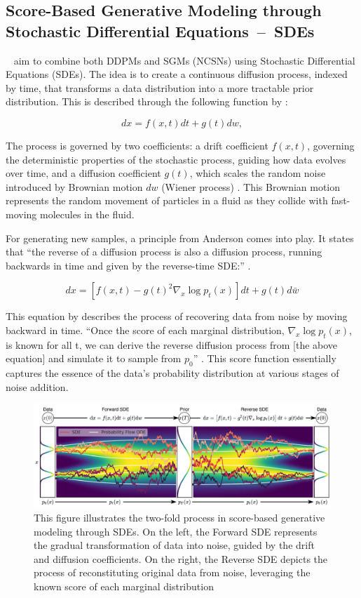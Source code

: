 \subsection{Score-Based Generative Modeling through Stochastic Differential Equations~--~SDEs}

~\citeauthor{song2020score} aim to combine both DDPMs and SGMs (NCSNs) using Stochastic Differential Equations (SDEs). The idea is to create a continuous diffusion process, indexed by time, that transforms a data distribution into a more tractable prior distribution. This is described through the following function by \citeauthor{song2020score}:

\[ dx = f(x, t)dt + g(t)dw, \]

The process is governed by two coefficients: a drift coefficient \( f(x, t) \), governing the deterministic properties of the stochastic process, guiding how data evolves over time, and a diffusion coefficient \( g(t) \), which scales the random noise introduced by Brownian motion \( dw \) (Wiener process) \citep{song2020score}. This Brownian motion represents the random movement of particles in a fluid as they collide with fast-moving molecules in the fluid. 


For generating new samples, a  principle from Anderson \citep{anderson1982313} comes into play. It states that ``the reverse of a diffusion process is also a diffusion process, running backwards in time and given by the reverse-time SDE:\@'' \citep{song2020score}.

\[ dx = \left[ f(x, t) - g{(t)}^2 \nabla_x \log p_t(x) \right] dt + g(t)d\bar{w} \]

This equation by \citeauthor{song2020score} describes the process of recovering data from noise by moving backward in time. ``Once the score of each marginal distribution, \(\nabla_x \log p_t(x) \), is known for all t, we can derive the reverse diffusion process from [the above equation] and simulate it to sample from \(p_0\)'' \citep{song2019SGM}. This score function essentially captures the essence of the data's probability distribution at various stages of noise addition.

\begin{figure}[ht]
  \centering
    \includegraphics[width=1\columnwidth]{figures/DiffusionModels_SDEs.png}
    \caption{This figure illustrates the two-fold process in score-based generative modeling through SDEs. On the left, the Forward SDE represents the gradual transformation of data into noise, guided by the drift and diffusion coefficients. On the right, the Reverse SDE depicts the process of reconstituting original data from noise, leveraging the known score of each marginal distribution~\citep{song2020score}}\label{fig:DM_SDEs}
\end{figure}

